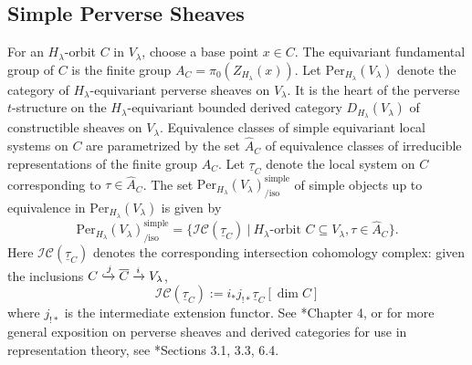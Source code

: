 \documentclass[11pt,letterpaper]{amsart}
\newcommand{\ol}{\overline}
\newcommand{\irrepdual}[1]{\widehat{#1}}
\newcommand{\Per}{\mathrm{Per}}
\newcommand{\locsys}[2]{\underline{#1}_{#2}}
\renewcommand{\1}{\mathbbm{1}}
\numberwithin{equation}{section}
\begin{document}
{\subsection{Simple Perverse Sheaves}\label{subsec: simple perverse sheaves}
For an $H_\lambda$-orbit $C$ in $V_\lambda$, choose a base point $x \in C$. The equivariant fundamental group of $C$ is the finite group $A_C=\pi_0(Z_{H_\lambda}(x))$. Let $\Per_{H_\lambda}(V_\lambda)$ denote the category of $H_\lambda$-equivariant perverse sheaves on $V_\lambda$. It is the heart of the perverse $t$-structure on the $H_\lambda$-equivariant bounded derived category $D_{H_\lambda}(V_\lambda)$ of constructible sheaves on $V_\lambda$. Equivalence classes of simple equivariant local systems on $C$ are parametrized by the set $\irrepdual{A}_C$ of equivalence classes of irreducible representations of the finite group $A_C$. Let $\locsys{\tau}{C}$ denote the local system on $C$ corresponding to $\tau \in \irrepdual{A}_C$. The set $\Per_{H_\lambda}(V_\lambda)_{\text{/iso}}^{\text{simple}}$ of simple objects up to equivalence in $\Per_{H_\lambda}(V_\lambda)$ is given by
\begin{equation}\label{eq: simple perverse sheaves classified}
    \Per_{H_\lambda}(V_\lambda)_{\text{/iso}}^{\text{simple}}=\{\mathcal{IC}(\locsys{\tau}{C})~\vert ~ H_\lambda \text{-orbit }C \subseteq V_\lambda, \tau \in \irrepdual{A}_C \}.
\end{equation}
Here $\mathcal{IC}(\locsys{\tau}{C})$ denotes 
the corresponding intersection cohomology complex: given the inclusions $C\xhookrightarrow{j}\ol{C}\xrightarrow[]{i}V_\lambda$, 
\begin{equation}\label{equation: ic definition}
    \mathcal{IC}(\locsys{\tau}{C}):=i_*j_{!*}\locsys{\tau}{C}[\dim C]
\end{equation}
where $j_{!*}$ is the intermediate extension functor. See \cite{CFMMX22}*{Chapter 4}, or for more general exposition on perverse sheaves and derived categories for use in representation theory, see \cite{Ach21}*{Sections  3.1, 3.3, 6.4}. 

}
\end{document}
